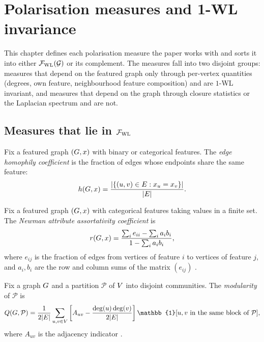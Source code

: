 
\section{Polarisation measures and 1-WL invariance}\label{sec:measures}

This chapter defines each polarisation measure the paper works with
and sorts it into either $\mathcal{F}_{\mathrm{WL}}(\mathcal{G})$ or its
complement. The measures fall into two disjoint groups: measures that
depend on the featured graph only through per-vertex quantities
(degrees, own feature, neighbourhood feature composition) and are
$1$-WL invariant, and measures that depend on the graph through
closure statistics or the Laplacian spectrum and are not.

\subsection{Measures that lie in $\mathcal{F}_{\mathrm{WL}}$}

\begin{definition}\label{def:homophily}
Fix a featured graph $(G, x)$ with binary or categorical
features. The \emph{edge homophily coefficient} is the fraction of
edges whose endpoints share the same feature:
\[
h(G, x) = \frac{|\{(u, v) \in E : x_u = x_v\}|}{|E|}.
\]
\end{definition}

\begin{definition}\label{def:assortativity}
Fix a featured graph $(G, x)$ with categorical features taking
values in a finite set. The \emph{Newman attribute assortativity
coefficient} is
\[
r(G, x) = \frac{\sum_i e_{ii} - \sum_i a_i b_i}{1 - \sum_i a_i
b_i},
\]
where $e_{ij}$ is the fraction of edges from vertices of feature $i$
to vertices of feature $j$, and $a_i, b_i$ are the row and column
sums of the matrix $(e_{ij})$ \citep{Newman2003}.
\end{definition}

\begin{definition}\label{def:modularity}
Fix a graph $G$ and a partition $\mathcal{P}$ of $V$ into
disjoint communities. The \emph{modularity} of $\mathcal{P}$ is
\[
Q(\gph, \mathcal{P}) = \frac{1}{2|\edges|} \sum_{u, v \in \vertices}
\left[ A_{uv} - \frac{\deg(u) \deg(v)}{2|\edges|}\right]
\mathbb{1}[u, v \text{ in the same block of } \mathcal{P}],
\]
where $A_{uv}$ is the adjacency indicator \citep{Newman2004}.
\end{definition}

